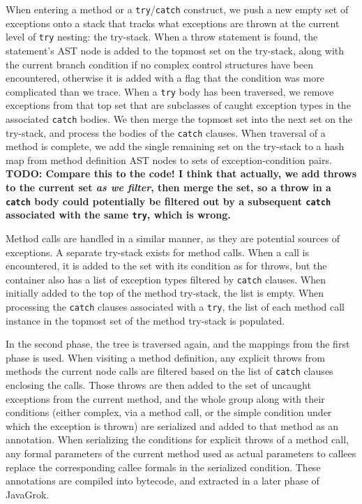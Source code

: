 When entering a method or a \texttt{try}/\texttt{catch} construct, we push a new empty set of exceptions onto
a stack that tracks what exceptions are thrown at the current level of
\texttt{try} nesting: the try-stack.
When a throw statement is found, the statement's AST node is added to the
topmost set on the try-stack, 
along with the current branch condition if no complex control structures have
been encountered, otherwise it is added with a flag that the condition was more
complicated than we trace.  When a \texttt{try} body has been traversed, we
remove exceptions from that top set that are subclasses of caught exception
types in the associated \texttt{catch} bodies.  We then merge the topmost set
into the next set on the try-stack, and process the bodies of
the \texttt{catch} clauses.  When traversal of a method is complete, we add the
single remaining set on the try-stack to a hash map from method definition AST
nodes to sets of exception-condition pairs.
{\bf\large TODO: Compare this to the code! I think that actually, we add throws to
the current set \emph{as we filter}, then merge the set, so a throw in a
\texttt{catch}
body could potentially be filtered out by a subsequent \texttt{catch} associated with the
same \texttt{try}, which is wrong.}

Method calls are handled in a similar manner, as they are potential sources of
exceptions.  A separate try-stack exists for method calls.  When a call is
encountered, it is added to the set with its condition as for throws, but the
container also has a list of exception types filtered by \texttt{catch} clauses.  When
initially added to the top of the method try-stack, the list is empty.  When
processing the \texttt{catch} clauses associated with a \texttt{try}, the list of each
method call instance in the topmost set of the method try-stack is populated. 

In the second phase, the tree is traversed again, and the mappings from the first
phase is used.  When visiting a method definition, any explicit throws from
methods the current node calls are filtered based on the list of \texttt{catch} clauses
enclosing the calls.  Those throws are then added to the set of uncaught
exceptions from the current method, and the whole group along with their
conditions (either complex, via a method call, or the simple condition under
which the exception is thrown) are serialized and added to that method as an
annotation.  When serializing the conditions for explicit throws of a method
call, any formal parameters of the current method used as actual parameters to
callees replace the corresponding callee formals in the serialized condition.
These annotations are compiled into bytecode, and extracted in a later phase of
JavaGrok.

